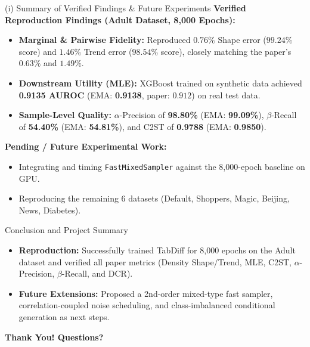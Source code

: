 \documentclass[aspectratio=169, 10pt]{beamer}
\begin{document}
\begin{frame}{(i) Summary of Verified Findings \& Future Experiments}
  \textbf{Verified Reproduction Findings (Adult Dataset, 8,000 Epochs):}
  \begin{itemize}
    \item \textbf{Marginal \& Pairwise Fidelity:} Reproduced $0.76\%$ Shape error ($99.24\%$ score) and $1.46\%$ Trend error ($98.54\%$ score), closely matching the paper's $0.63\%$ and $1.49\%$.
    \item \textbf{Downstream Utility (MLE):} XGBoost trained on synthetic data achieved \textbf{0.9135 AUROC} (EMA: \textbf{0.9138}, paper: $0.912$) on real test data.
    \item \textbf{Sample-Level Quality:} $\alpha$-Precision of \textbf{98.80\%} (EMA: \textbf{99.09\%}), $\beta$-Recall of \textbf{54.40\%} (EMA: \textbf{54.81\%}), and C2ST of \textbf{0.9788} (EMA: \textbf{0.9850}).
  \end{itemize}
  \vspace{0.2cm}
  \textbf{Pending / Future Experimental Work:}
  \begin{itemize}
    \item Integrating and timing \texttt{FastMixedSampler} against the 8,000-epoch baseline on GPU.
    \item Reproducing the remaining 6 datasets (Default, Shoppers, Magic, Beijing, News, Diabetes).
  \end{itemize}
\end{frame}

\begin{frame}{Conclusion and Project Summary}
  \begin{itemize}
    \item \textbf{Reproduction:} Successfully trained TabDiff for 8,000 epochs on the Adult dataset and verified all paper metrics (Density Shape/Trend, MLE, C2ST, $\alpha$-Precision, $\beta$-Recall, and DCR).
    \item \textbf{Future Extensions:} Proposed a 2nd-order mixed-type fast sampler, correlation-coupled noise scheduling, and class-imbalanced conditional generation as next steps.
  \end{itemize}
  \vspace{0.4cm}
  \centering
  \Large \textbf{Thank You! Questions?}
\end{frame}
\end{document}
